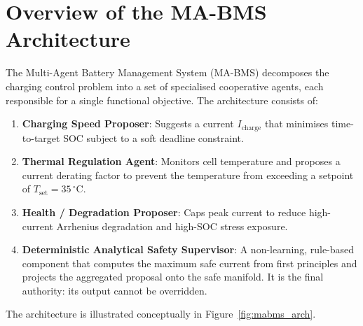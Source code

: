 \label{chap.5}

\section{Overview of the MA-BMS Architecture}

The Multi-Agent Battery Management System (MA-BMS) decomposes the
charging control problem into a set of specialised cooperative
agents, each responsible for a single functional objective.  The
architecture consists of:

\begin{enumerate}
  \item \textbf{Charging Speed Proposer}: Suggests a current
  $I_{\mathrm{charge}}$ that minimises time-to-target SOC subject
  to a soft deadline constraint.

  \item \textbf{Thermal Regulation Agent}: Monitors cell temperature
  and proposes a current derating factor to prevent the temperature
  from exceeding a setpoint of $T_{\mathrm{set}} =
  35\,^\circ\mathrm{C}$.

  \item \textbf{Health / Degradation Proposer}: Caps peak current
  to reduce high-current Arrhenius degradation and high-SOC
  stress exposure.

  \item \textbf{Deterministic Analytical Safety Supervisor}: A
  non-learning, rule-based component that computes the maximum
  safe current from first principles and projects the aggregated
  proposal onto the safe manifold.  It is the final authority:
  its output cannot be overridden.
\end{enumerate}

The architecture is illustrated conceptually in
Figure~\ref{fig:mabms_arch}.

